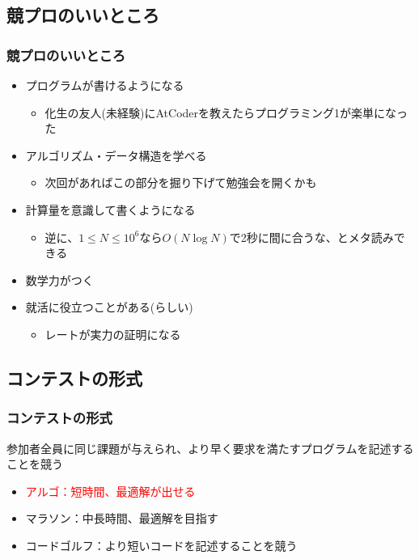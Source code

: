 \documentclass[t, aspectratio=169, dvipdfmx]{beamer}
\begin{document}
\subsection{競プロのいいところ}
\begin{frame}
  \frametitle{競プロのいいところ}
  \begin{itemize}
    \item プログラムが書けるようになる
    \begin{itemize}
      \item 化生の友人(未経験)にAtCoderを教えたらプログラミング1が楽単になった
    \end{itemize}
    \item アルゴリズム・データ構造を学べる
    \begin{itemize}
      \item 次回があればこの部分を掘り下げて勉強会を開くかも
    \end{itemize}
    \item 計算量を意識して書くようになる
    \begin{itemize}
      \item 逆に、$1 \leq N \leq 10^6$なら$O(N \log N)$で2秒に間に合うな、とメタ読みできる
    \end{itemize}
    \item 数学力がつく
    \item 就活に役立つことがある(らしい)
    \begin{itemize}
      \item レートが実力の証明になる
    \end{itemize}
  \end{itemize}
\end{frame}

\subsection{コンテストの形式}
\begin{frame}
  \frametitle{コンテストの形式}
  参加者全員に同じ課題が与えられ、より早く要求を満たすプログラムを記述することを競う
  \begin{itemize}
    \item \textcolor{red}{アルゴ：短時間、最適解が出せる}
    \item マラソン：中長時間、最適解を目指す
    \item コードゴルフ：より短いコードを記述することを競う
  \end{itemize}
\end{frame}
\end{document}
